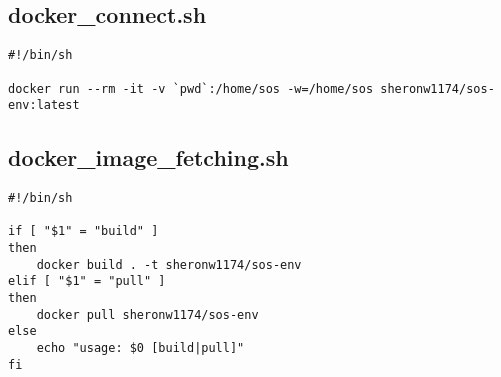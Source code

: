 \documentclass[main.tex]{subfiles}
\begin{document}
\subsection{docker_connect.sh}
\begin{lstlisting}
#!/bin/sh

docker run --rm -it -v `pwd`:/home/sos -w=/home/sos sheronw1174/sos-env:latest
\end{lstlisting}

\subsection{docker_image_fetching.sh}
\begin{lstlisting}
#!/bin/sh

if [ "$1" = "build" ]
then
    docker build . -t sheronw1174/sos-env
elif [ "$1" = "pull" ]
then
    docker pull sheronw1174/sos-env
else
    echo "usage: $0 [build|pull]"
fi
\end{lstlisting}
\end{document}
